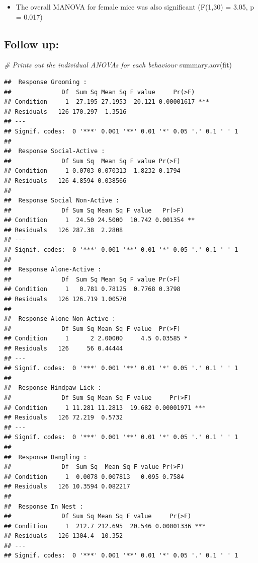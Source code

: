 \documentclass[
]{book}
\newenvironment{Shaded}{\begin{snugshade}}{\end{snugshade}}
\newcommand{\CommentTok}[1]{\textcolor[rgb]{0.56,0.35,0.01}{\textit{#1}}}
\newcommand{\FunctionTok}[1]{\textcolor[rgb]{0.00,0.00,0.00}{#1}}
\newcommand{\NormalTok}[1]{#1}
\providecommand{\tightlist}{%
  \setlength{\itemsep}{0pt}\setlength{\parskip}{0pt}}
\begin{document}
\begin{itemize}
\tightlist
\item
  The overall MANOVA for female mice was also significant (F(1,30) = 3.05, p = 0.017)
\end{itemize}

\hypertarget{follow-up}{%
\subsection{Follow up:}\label{follow-up}}

\begin{Shaded}
\begin{Highlighting}[]
\CommentTok{\# Prints out the individual ANOVAs for each behaviour}
\FunctionTok{summary.aov}\NormalTok{(fit)}
\end{Highlighting}
\end{Shaded}

\begin{verbatim}
##  Response Grooming :
##              Df  Sum Sq Mean Sq F value     Pr(>F)    
## Condition     1  27.195 27.1953  20.121 0.00001617 ***
## Residuals   126 170.297  1.3516                       
## ---
## Signif. codes:  0 '***' 0.001 '**' 0.01 '*' 0.05 '.' 0.1 ' ' 1
## 
##  Response Social-Active :
##              Df Sum Sq  Mean Sq F value Pr(>F)
## Condition     1 0.0703 0.070313  1.8232 0.1794
## Residuals   126 4.8594 0.038566               
## 
##  Response Social Non-Active :
##              Df Sum Sq Mean Sq F value   Pr(>F)   
## Condition     1  24.50 24.5000  10.742 0.001354 **
## Residuals   126 287.38  2.2808                    
## ---
## Signif. codes:  0 '***' 0.001 '**' 0.01 '*' 0.05 '.' 0.1 ' ' 1
## 
##  Response Alone-Active :
##              Df  Sum Sq Mean Sq F value Pr(>F)
## Condition     1   0.781 0.78125  0.7768 0.3798
## Residuals   126 126.719 1.00570               
## 
##  Response Alone Non-Active :
##              Df Sum Sq Mean Sq F value  Pr(>F)  
## Condition     1      2 2.00000     4.5 0.03585 *
## Residuals   126     56 0.44444                  
## ---
## Signif. codes:  0 '***' 0.001 '**' 0.01 '*' 0.05 '.' 0.1 ' ' 1
## 
##  Response Hindpaw Lick :
##              Df Sum Sq Mean Sq F value     Pr(>F)    
## Condition     1 11.281 11.2813  19.682 0.00001971 ***
## Residuals   126 72.219  0.5732                       
## ---
## Signif. codes:  0 '***' 0.001 '**' 0.01 '*' 0.05 '.' 0.1 ' ' 1
## 
##  Response Dangling :
##              Df  Sum Sq  Mean Sq F value Pr(>F)
## Condition     1  0.0078 0.007813   0.095 0.7584
## Residuals   126 10.3594 0.082217               
## 
##  Response In Nest :
##              Df Sum Sq Mean Sq F value     Pr(>F)    
## Condition     1  212.7 212.695  20.546 0.00001336 ***
## Residuals   126 1304.4  10.352                       
## ---
## Signif. codes:  0 '***' 0.001 '**' 0.01 '*' 0.05 '.' 0.1 ' ' 1
\end{verbatim}
\end{document}
